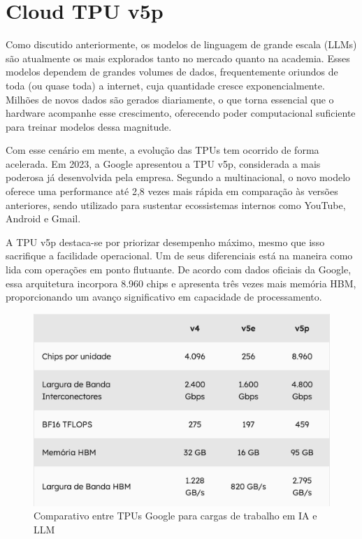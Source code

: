 \documentclass{report}
\begin{document}
\chapter{Cloud TPU v5p}

Como discutido anteriormente, os modelos de linguagem de grande escala (LLMs) são atualmente os mais explorados tanto no mercado quanto na academia. Esses modelos dependem de grandes volumes de dados, frequentemente oriundos de toda (ou quase toda) a internet, cuja quantidade cresce exponencialmente. Milhões de novos dados são gerados diariamente, o que torna essencial que o hardware acompanhe esse crescimento, oferecendo poder computacional suficiente para treinar modelos dessa magnitude.

Com esse cenário em mente, a evolução das TPUs tem ocorrido de forma acelerada. Em 2023, a Google apresentou a TPU v5p, considerada a mais poderosa já desenvolvida pela empresa. Segundo a multinacional, o novo modelo oferece uma performance até 2,8 vezes mais rápida em comparação às versões anteriores, sendo utilizado para sustentar ecossistemas internos como YouTube, Android e Gmail.

A TPU v5p destaca-se por priorizar desempenho máximo, mesmo que isso sacrifique a facilidade operacional. Um de seus diferenciais está na maneira como lida com operações em ponto flutuante. De acordo com dados oficiais da Google, essa arquitetura incorpora 8.960 chips e apresenta três vezes mais memória HBM, proporcionando um avanço significativo em capacidade de processamento.

\begin{figure}[h]
\includegraphics[scale=0.7]{comparativo-tpus}
\centering
\caption{Comparativo entre TPUs Google para cargas de trabalho em IA e LLM}
\end{figure}
\end{document}

